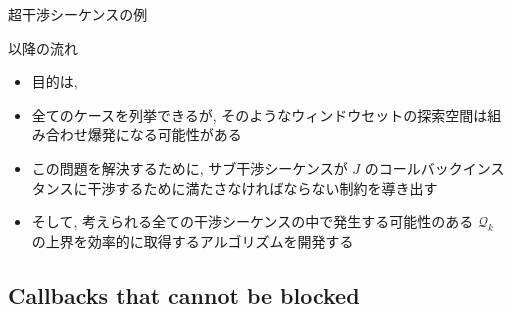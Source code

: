 \begin{frame}{超干渉シーケンスの例}
\end{frame}


\begin{frame}{以降の流れ}
    \begin{itemize}
        \item 目的は, \\ 
        \item 全てのケースを列挙できるが, そのようなウィンドウセットの探索空間は組み合わせ爆発になる可能性がある
        \item この問題を解決するために, サブ干渉シーケンスが $J$ のコールバックインスタンスに干渉するために満たさなければならない制約を導き出す
        \item そして, 考えられる全ての干渉シーケンスの中で発生する可能性のある $\mathcal{Q}_{k}$ の上界を効率的に取得するアルゴリズムを開発する
    \end{itemize}
\end{frame}


\subsection{Callbacks that cannot be blocked}
\label{ssec: callbacks_that_cannot_be_blocked}

